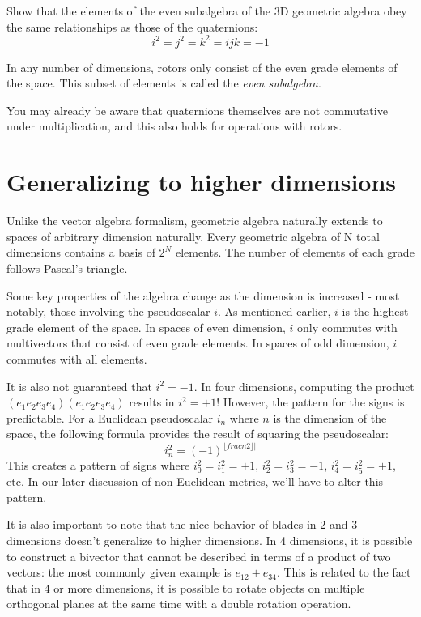 \begin{expl}
    Show that the elements of the even subalgebra of the 3D geometric algebra obey the same 
    relationships as those of the quaternions: $$i^2 = j^2 = k^2 = ijk = -1$$
\end{expl}

In any number of dimensions, rotors only consist of the even grade elements of the space. This
subset of elements is called the \textit{even subalgebra}.

You may already be aware that quaternions themselves are not commutative under multiplication, and
this also holds for operations with rotors.

\section{Generalizing to higher dimensions}

Unlike the vector algebra formalism, geometric algebra naturally extends to spaces of arbitrary
dimension naturally. Every geometric algebra of N total dimensions contains a basis of $2^N$
elements. The number of elements of each grade follows Pascal's triangle.

Some key properties of the algebra change as the dimension is increased - most notably, those
involving the pseudoscalar $i$. As mentioned earlier, $i$ is the highest grade element of the space.
In spaces of even dimension, $i$ only commutes with multivectors that consist of even grade
elements. In spaces of odd dimension, $i$ commutes with all elements.

It is also not guaranteed that $i^2 = -1$. In four dimensions, computing the product
$\left(e_1 e_2 e_3 e_4\right)\left(e_1 e_2 e_3 e_4\right)$ results in $i^2 = +1$! However, the
pattern for the signs is predictable. For a Euclidean pseudoscalar $i_n$ where $n$ is the dimension
of the space, the following formula provides the result of squaring the pseudoscalar: 
$$
i_n^2 = \left(-1\right)^{\lfloor frac{n}{2} \rfloor|}
$$
This creates a pattern of signs where $i_0^2 = i_1^2 = +1$, $i_2^2 = i_3^2 = -1$, $i_4^2 = i_5^2 =
+1$, etc. In our later discussion of non-Euclidean metrics, we'll have to alter this pattern.

It is also important to note that the nice behavior of blades in 2 and 3 dimensions doesn't 
generalize to higher dimensions. In 4 dimensions, it is possible to construct a bivector that
cannot be described in terms of a product of two vectors: the most commonly given example is
$e_{12} + e_{34}$. This is related to the fact that in 4 or more dimensions, it is possible to 
rotate objects on multiple orthogonal planes at the same time with a double rotation operation.

